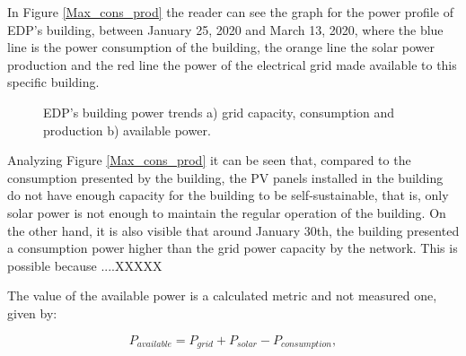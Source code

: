 In Figure \ref{Max_cons_prod} the reader can see the graph for the power profile of \ac{EDP}’s building, between January 25, 2020 and March 13, 2020, where the blue line is the power consumption of the building, the orange line the solar power production and the red line the power of the electrical grid made available to this specific building.


\begin{figure}[h!]
    \captionsetup[subfigure]{position=b}
    \centering
    \label{fig:ap}
    \caption{EDP's building power trends a) grid capacity, consumption and production b) available power.}
\end{figure}




Analyzing Figure \ref{Max_cons_prod} it can be seen that, compared to the consumption presented by the building, the \ac{PV} panels installed in the building do not have enough capacity for the building to be self-sustainable, that is, only solar power is not enough to maintain the regular operation of the building. On the other hand, it is also visible that around January 30th, the building presented a consumption power higher than the grid power capacity by the network. This is possible because ....XXXXX


The value of the available power is a calculated metric and not measured one, given by:

\begin{equation}
   P_{available} = P_{grid} + P_{solar} - P_{consumption},
   \label{available}
\end{equation}

